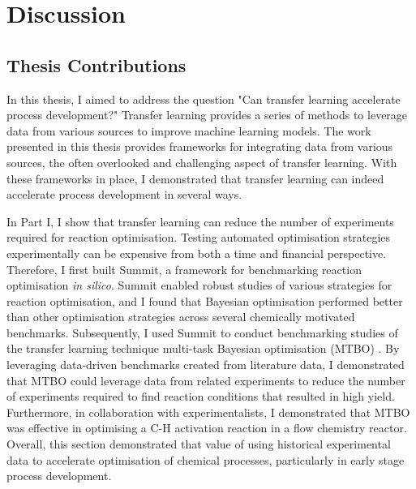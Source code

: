 \chapter{Discussion}\label{ch:discussion} 

\section{Thesis Contributions}

In this thesis, I aimed to address the question "Can transfer learning accelerate process development?"  Transfer learning provides a series of methods to leverage data from various sources to improve machine learning models. The work presented in this thesis provides frameworks for integrating data from various sources, the often overlooked and challenging aspect of transfer learning. With these frameworks in place, I demonstrated that transfer learning can indeed accelerate process development in several ways. 

In Part I, I show that transfer learning can reduce the number of experiments required for reaction optimisation. Testing automated optimisation strategies experimentally can be expensive from both a time and financial perspective.  Therefore, I first built Summit, a framework for benchmarking reaction optimisation \textit{in silico}. Summit enabled robust studies of various strategies for reaction optimisation, and I found that Bayesian optimisation performed better than other optimisation strategies across several chemically motivated benchmarks. Subsequently, I used Summit to conduct benchmarking studies of the transfer learning technique multi-task Bayesian optimisation (MTBO) \cite{Swersky2013}. By leveraging data-driven benchmarks created from literature data, I demonstrated that MTBO could leverage data from related experiments to reduce the number of experiments required to find reaction conditions that resulted in high yield. Furthermore, in collaboration with experimentalists, I demonstrated that MTBO was effective in optimising a C-H activation reaction in a flow chemistry reactor.  Overall, this section demonstrated that value of using historical experimental data to accelerate optimisation of chemical processes, particularly in early stage process development.

